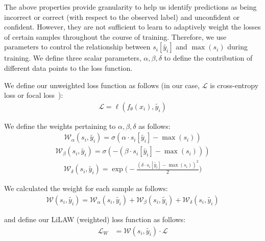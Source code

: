 \documentclass{article}
\theoremstyle{plain}
\theoremstyle{definition}
\theoremstyle{remark}
\begin{document}
The above properties provide granularity to help us identify predictions as being incorrect or correct (with respect to the observed label) and unconfident or confident. However, they are not sufficient to learn to adaptively weight the losses of certain samples throughout the course of training. Therefore, we use parameters to control the relationship between $s_i[\widetilde{y_i}]$ and $\max(s_i)$ during training. We define three scalar parameters, $\alpha, \beta, \delta$ to define the contribution of different data points to the loss function.

We define our unweighted loss function as follows (in our case, $\mathcal{L}$ is cross-entropy loss or focal loss~\citep{focalloss}): 
\begin{align}
    \mathcal{L} = \ell(f_{\theta}(x_i), \widetilde{y_i})
\end{align}

We define the weights pertaining to $\alpha,\beta,\delta$ as follows:
\begin{align}
    \mathcal{W}_\alpha (s_i, \widetilde{y_i}) = \sigma(\alpha \cdot s_i[\widetilde{y_i}] - \max(s_i))
\end{align}
\begin{align}
    \mathcal{W}_\beta (s_i, \widetilde{y_i}) = \sigma(-(\beta \cdot s_i[\widetilde{y_i}] - \max(s_i)))
\end{align}
\begin{align}
    \mathcal{W}_\delta (s_i, \widetilde{y_i}) = \exp\biggl(-\frac{(\delta \cdot s_i[\widetilde{y_i}] - \max(s_i))^2}{2}\biggr)
\end{align}

\noindent We calculated the weight for each sample as follows:
\begin{align}
    \mathcal{W}(s_i, \widetilde{y_i}) = \mathcal{W}_\alpha (s_i, \widetilde{y_i}) + \mathcal{W}_\beta (s_i, \widetilde{y_i}) + \mathcal{W}_\delta (s_i, \widetilde{y_i})
\end{align}

\noindent and define our LiLAW (weighted) loss function as follows:
\begin{align}
\mathcal{L}_{W} &= \mathcal{W}(s_i, \widetilde{y_i}) \cdot \mathcal{L}
\end{align}
\end{document}

